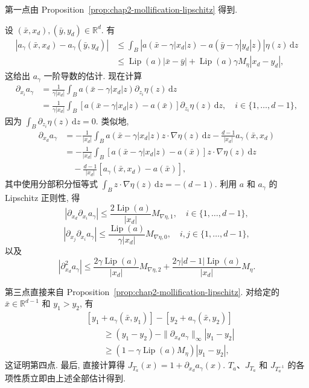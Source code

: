 \begin{Proof}
第一点由 Proposition~\ref{prop:chap2-mollification-lipschitz} 得到.

设 $(\bar x,x_d),(\bar y,y_d)\in\mathbb R^d$. 有
\[
\begin{aligned}
 |a_\gamma(\bar x,x_d)-a_\gamma(\bar y,y_d)|
 &\leq\int_B|a(\bar x-\gamma|x_d|z)-a(\bar y-\gamma|y_d|z)|\eta(z)\,\mathrm dz\\
 &\leq\operatorname{Lip}(a)|\bar x-\bar y|
 +\operatorname{Lip}(a)\gamma M_\eta|x_d-y_d|,
\end{aligned}
\]
这给出 $a_\gamma$ 一阶导数的估计. 现在计算
\[
\begin{aligned}
 \partial_{x_i}a_\gamma
 &=\frac1{\gamma|x_d|}\int_Ba(\bar x-\gamma|x_d|z)\partial_{z_i}\eta(z)\,\mathrm dz\\
 &=\frac1{\gamma|x_d|}\int_B
 [a(\bar x-\gamma|x_d|z)-a(\bar x)]\partial_{z_i}\eta(z)\,\mathrm dz,
 \quad i\in\{1,\ldots,d-1\},
\end{aligned}
\]
因为 $\int_B\partial_{z_i}\eta(z)\,\mathrm dz=0$. 类似地,
\[
\begin{aligned}
 \partial_{x_d}a_\gamma
 &=-\frac1{|x_d|}\int_Ba(\bar x-\gamma|x_d|z)z\cdot\nabla\eta(z)\,\mathrm dz
 -\frac{d-1}{|x_d|}a_\gamma(\bar x,x_d)\\
 &=-\frac1{|x_d|}\int_B[a(\bar x-\gamma|x_d|z)-a(\bar x)]z\cdot\nabla\eta(z)\,\mathrm dz\\
 &\quad-\frac{d-1}{|x_d|}[a_\gamma(\bar x,x_d)-a(\bar x)],
\end{aligned}
\]
其中使用分部积分恒等式 $\int_Bz\cdot\nabla\eta(z)\,\mathrm dz=-(d-1)$. 利用 $a$ 和 $a_\gamma$ 的 Lipschitz 正则性, 得
\[
 |\partial_{x_d}\partial_{x_i}a_\gamma|
 \leq\frac{2\operatorname{Lip}(a)}{|x_d|}M_{\nabla\eta,1},
 \quad i\in\{1,\ldots,d-1\},
\]
\[
 |\partial_{x_j}\partial_{x_i}a_\gamma|
 \leq\frac{\operatorname{Lip}(a)}{\gamma|x_d|}M_{\nabla\eta,0},
 \quad i,j\in\{1,\ldots,d-1\},
\]
以及
\[
 |\partial_{x_d}^2a_\gamma|
 \leq\frac{2\gamma\operatorname{Lip}(a)}{|x_d|}M_{\nabla\eta,2}
 +\frac{2\gamma|d-1|\operatorname{Lip}(a)}{|x_d|}M_\eta.
\]

第三点直接来自 Proposition~\ref{prop:chap2-mollification-lipschitz}. 对给定的 $\bar x\in\mathbb R^{d-1}$ 和 $y_1>y_2$, 有
\[
\begin{aligned}
 &[y_1+a_\gamma(\bar x,y_1)]-[y_2+a_\gamma(\bar x,y_2)]\\
 &\qquad\geq(y_1-y_2)-\|\partial_{x_d}a_\gamma\|_\infty|y_1-y_2|\\
 &\qquad\geq(1-\gamma\operatorname{Lip}(a)M_\eta)|y_1-y_2|,
\end{aligned}
\]
这证明第四点. 最后, 直接计算得 $J_{T_a}(x)=1+\partial_{x_d}a_\gamma(x)$. $T_a$、$J_{T_a}$ 和 $J_{T_a^{-1}}$ 的各项性质立即由上述全部估计得到.
\end{Proof}

